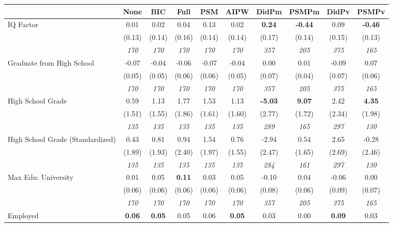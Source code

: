 \begin{tabular}{l c c c c c c c c c}
\toprule
 & None & BIC & Full & PSM & AIPW & DidPm & PSMPm & DidPv & PSMPv \\
\midrule
IQ Factor & 0.01 & 0.02 & 0.04 & 0.13 & 0.02 & \textbf{ 0.24 } & \textbf{-0.44} & 0.09 & \textbf{-0.46} \\
& (0.13) & (0.14) & (0.16) & (0.14) & (0.14) & (0.17) & (0.14) & (0.15) & (0.13) \\
& \textit{ 170 } & \textit{ 170 } & \textit{ 170 } & \textit{ 170 } & \textit{ 170 } & \textit{ 357 } & \textit{ 205 } & \textit{ 375 } & \textit{ 165 } \\
Graduate from High School & -0.07 & -0.04 & -0.06 & -0.07 & -0.04 & 0.00 & 0.01 & -0.09 & 0.07 \\
& (0.05) & (0.05) & (0.06) & (0.06) & (0.05) & (0.07) & (0.04) & (0.07) & (0.06) \\
& \textit{ 170 } & \textit{ 170 } & \textit{ 170 } & \textit{ 170 } & \textit{ 170 } & \textit{ 357 } & \textit{ 205 } & \textit{ 375 } & \textit{ 165 } \\
High School Grade & 0.59 & 1.13 & 1.77 & 1.53 & 1.13 & \textbf{ -5.03 } & \textbf{9.07} & 2.42 & \textbf{4.35} \\
& (1.51) & (1.55) & (1.86) & (1.61) & (1.60) & (2.77) & (1.72) & (2.34) & (1.98) \\
& \textit{ 135 } & \textit{ 135 } & \textit{ 135 } & \textit{ 135 } & \textit{ 135 } & \textit{ 289 } & \textit{ 165 } & \textit{ 297 } & \textit{ 130 } \\
High School Grade (Standardized) & 0.43 & 0.81 & 0.94 & 1.54 & 0.76 & -2.94 & 0.54 & 2.65 & -0.28 \\
& (1.89) & (1.93) & (2.40) & (1.97) & (1.55) & (2.47) & (1.65) & (2.69) & (2.46) \\
& \textit{ 135 } & \textit{ 135 } & \textit{ 135 } & \textit{ 135 } & \textit{ 135 } & \textit{ 284 } & \textit{ 161 } & \textit{ 297 } & \textit{ 130 } \\
Max Edu: University & 0.01 & 0.05 & \textbf{ 0.11 } & 0.03 & 0.05 & -0.10 & 0.04 & -0.06 & 0.00 \\
& (0.06) & (0.06) & (0.06) & (0.06) & (0.06) & (0.08) & (0.06) & (0.09) & (0.07) \\
& \textit{ 170 } & \textit{ 170 } & \textit{ 170 } & \textit{ 170 } & \textit{ 170 } & \textit{ 357 } & \textit{ 205 } & \textit{ 375 } & \textit{ 165 } \\
Employed & \textbf{ 0.06 } & \textbf{ 0.05 } & 0.05 & 0.06 & \textbf{0.05} & 0.03 & 0.00 & \textbf{ 0.09 } & 0.03 \\

\end{tabular}

